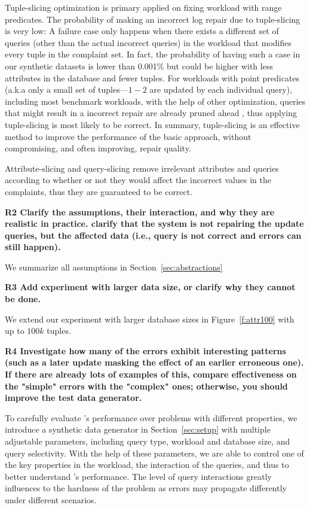 Tuple-slicing optimization is primary applied on fixing workload with range predicates. The probability of making an incorrect log repair due to tuple-slicing is very low: A failure case only happens when there exists a different set of queries (other than the actual incorrect queries) in the workload that modifies every tuple in the complaint set. In fact, the probability of having such a case in our synthetic datasets is lower than 0.001\% but could be higher with less attributes in the database and fewer tuples. For workloads with point predicates (a.k.a only a small set of tuples---$1-2$ are updated by each individual query), including most benchmark workloads, with the help of other optimization, queries that might result in a incorrect repair are already pruned ahead , thus applying tuple-slicing is most likely to be correct. In summary, tuple-slicing is an effective method to improve the performance of the basic approach, without compromising, and often improving, repair quality.

Attribute-slicing and query-slicing remove irrelevant attributes and queries according to whether or not they would affect the incorrect values in the complaints, thus they are guaranteed to be correct. 

\noindent \textbf{R2 Clarify the assumptions, their interaction, and why they are realistic in practice. clarify that the system is not repairing the update queries, but the affected data (i.e., query is not correct and errors can still happen).} 

We summarize all assumptions in Section~\ref{sec:abstractions} 

\noindent \textbf{R3 Add experiment with larger data size, or clarify why they cannot be done.}

We extend our experiment with larger database sizes in Figure~\ref{f:attr100} with up to $100k$ tuples. 

\noindent \textbf{R4 Investigate how many of the errors exhibit interesting patterns (such as a later update masking the effect of an earlier erroneous one). If there are already lots of examples of this, compare effectiveness on the "simple" errors with the "complex" ones; otherwise, you should improve the test data generator.}

To carefully evaluate \sys's performance over problems with different properties, we introduce a synthetic data generator in Section~\ref{sec:setup} with multiple adjustable parameters, including query type, workload and database size, and query selectivity. 
With the help of these parameters, we are able to control one of the key properties in the workload, the interaction of the queries, 
and thus to better understand \sys's performance. The level of query interactions greatly influences to the hardness of the problem as errors may propagate differently under different scenarios. 

